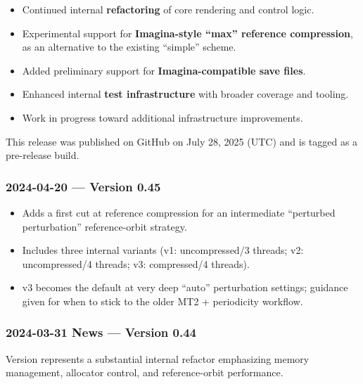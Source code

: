 \begin{itemize}

  \item Continued internal \textbf{refactoring} of core rendering and control logic.
  
  \item Experimental support for \textbf{Imagina-style “max” reference compression},
        as an alternative to the existing “simple” scheme.
  
  \item Added preliminary support for \textbf{Imagina-compatible save files}.

  \item Enhanced internal \textbf{test infrastructure} with broader coverage and tooling.
    
  \item Work in progress toward additional infrastructure improvements.

\end{itemize}

This release was published on GitHub on July 28, 2025 (UTC) and is tagged as a
pre-release build.  


\subsubsection{2024-04-20 --- Version 0.45}

\begin{itemize}
  
  \item Adds a first cut at reference compression for an intermediate “perturbed
  perturbation” reference-orbit strategy.

  \item Includes three internal variants (v1: uncompressed/3 threads; v2:
  uncompressed/4 threads; v3: compressed/4 threads).

  \item v3 becomes the default at very deep “auto” perturbation settings;
  guidance given for when to stick to the older MT2 + periodicity workflow.

\end{itemize}


\subsubsection{2024-03-31 News --- Version 0.44}

Version  represents a substantial internal refactor emphasizing memory management, allocator control, and reference-orbit performance.

